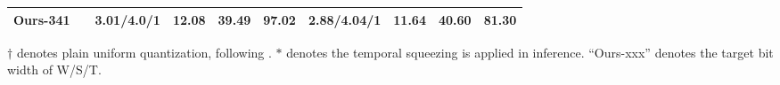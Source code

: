 \begin{table}[t]
\begin{adjustbox}{max width=0.9\textwidth}
\begin{threeparttable}
\begin{tabular}{cccccccccc}
Ours-341                         &                               & \textbf{3.01/4.0/1}  & \textbf{12.08} & \textbf{39.49}          & \textbf{97.02} & \textbf{2.88/4.04/1}    & \textbf{11.64} & \textbf{40.60}          & \textbf{81.30}\\ \bottomrule         
\end{tabular}
\begin{tablenotes}
\footnotesize
\item $\dagger$ denotes plain uniform quantization, following  \cite{shen2024conventional}. $*$ denotes the temporal squeezing is applied in inference.  “Ours-xxx” denotes the target bit width of W/S/T.
\end{tablenotes}
\end{threeparttable}
\end{adjustbox}
\end{table}

